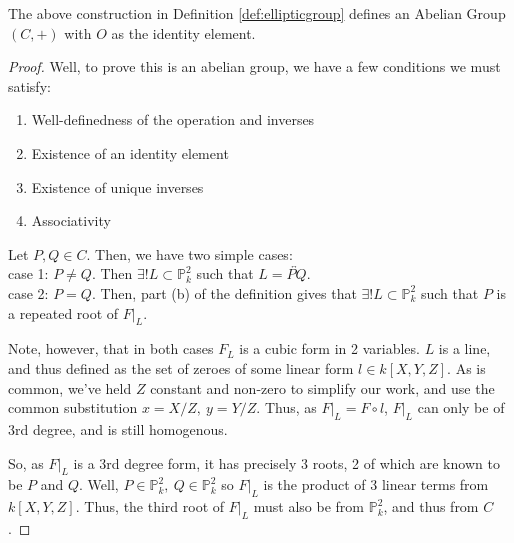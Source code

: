 \begin{theorem}
The above construction in Definition \ref{def:ellipticgroup} defines
an Abelian Group $(C,+)$ with $O$ as the identity element.
\end{theorem}

\begin{proof}
Well, to prove this is an abelian group, we have a few conditions we must satisfy:
\begin{enumerate}
\item Well-definedness of the operation and inverses
\item Existence of an identity element
\item Existence of unique inverses
\item Associativity
\end{enumerate}

Let $P, Q \in C$. Then, we have two simple cases:\\

case 1:  $P \ne Q$. Then $\exists! L \subset \mathbb{P}^2_k$ such that $L = \overleftrightarrow{PQ}$.\\

case 2: $P = Q$. Then, part (b) of the definition gives that $\exists! L \subset \mathbb{P}^2_k$ such that
$P$ is a repeated root of $F|_L$.

Note, however, that in both cases $F_L$ is a cubic form in 2 variables. $L$ is 
a line, and thus defined as the set of zeroes of some linear form $l \in k[X,Y,Z]$. As is common, we've
held $Z$ constant and non-zero to simplify our work, and use the common substitution
$x=X/Z,~y=Y/Z$. Thus, as $F|_L = F \circ l$, $F|_L$ can only be of 3rd degree,
and is still homogenous.

So, as $F|_L$ is a 3rd degree form, it has precisely 3 roots, 2 of which
are known to be $P$ and $Q$. Well, $P \in \mathbb{P}^2_k,~Q\in \mathbb{P}^2_k$
so $F|_L$ is the product of 3 linear terms from $k[X,Y,Z]$. Thus, the
third root of $F|_L$ must also be from $\mathbb{P}^2_k$, and thus from $C$.

\end{proof}
